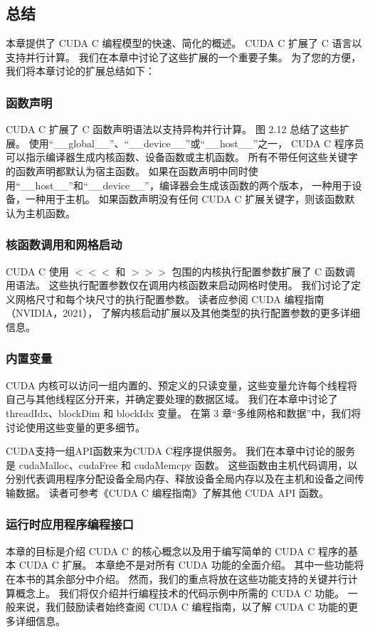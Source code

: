 \subsection{总结}
本章提供了 CUDA C 编程模型的快速、简化的概述。 CUDA C 扩展了 C 语言以支持并行计算。 
我们在本章中讨论了这些扩展的一个重要子集。 为了您的方便，我们将本章讨论的扩展总结如下：

\subsubsection{函数声明}
CUDA C 扩展了 C 函数声明语法以支持异构并行计算。 图 2.12 总结了这些扩展。 
使用“\_\_global\_\_”、“\_\_device\_\_”或“\_\_host\_\_”之一，
CUDA C 程序员可以指示编译器生成内核函数、设备函数或主机函数。 所有不带任何这些关键字的函数声明都默认为宿主函数。 
如果在函数声明中同时使用“\_\_host\_\_”和“\_\_device\_\_”，编译器会生成该函数的两个版本，
一种用于设备，一种用于主机。 如果函数声明没有任何 CUDA C 扩展关键字，则该函数默认为主机函数。

\subsubsection{核函数调用和网格启动}
CUDA C 使用 $<<<$ 和 $>>>$ 包围的内核执行配置参数扩展了 C 函数调用语法。
这些执行配置参数仅在调用内核函数来启动网格时使用。 
我们讨论了定义网格尺寸和每个块尺寸的执行配置参数。 读者应参阅 CUDA 编程指南（NVIDIA，2021），
了解内核启动扩展以及其他类型的执行配置参数的更多详细信息。


\subsubsection{内置变量}
CUDA 内核可以访问一组内置的、预定义的只读变量，这些变量允许每个线程将自己与其他线程区分开来，并确定要处理的数据区域。 
我们在本章中讨论了 threadIdx、blockDim 和 blockIdx 变量。 
在第 3 章“多维网格和数据”中，我们将讨论使用这些变量的更多细节。

CUDA支持一组API函数来为CUDA C程序提供服务。 我们在本章中讨论的服务是 cudaMalloc、cudaFree 和 cudaMemcpy 函数。 
这些函数由主机代码调用，以分别代表调用程序分配设备全局内存、释放设备全局内存以及在主机和设备之间传输数据。 
读者可参考《CUDA C 编程指南》了解其他 CUDA API 函数。


\subsubsection{运行时应用程序编程接口}
本章的目标是介绍 CUDA C 的核心概念以及用于编写简单的 CUDA C 程序的基本 CUDA C 扩展。 
本章绝不是对所有 CUDA 功能的全面介绍。 其中一些功能将在本书的其余部分中介绍。 
然而，我们的重点将放在这些功能支持的关键并行计算概念上。 我们将仅介绍并行编程技术的代码示例中所需的 CUDA C 功能。 
一般来说，我们鼓励读者始终查阅 CUDA C 编程指南，以了解 CUDA C 功能的更多详细信息。